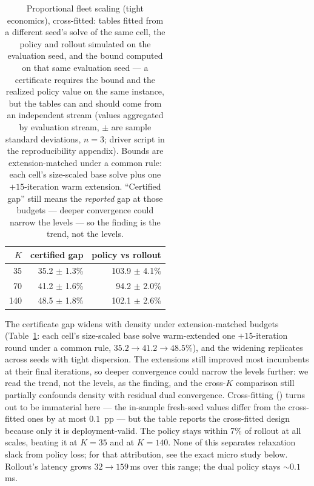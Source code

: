 \documentclass[11pt]{article}
\begin{document}
\begin{table}[t]
\centering
\caption{Proportional fleet scaling (tight economics), cross-fitted:
tables fitted from a different seed's solve of the same cell, the
policy and rollout simulated on the evaluation seed, and the bound
computed on that same evaluation seed --- a certificate requires the
bound and the realized policy value on the same instance, but the
tables can and should come from an independent stream (values
aggregated by evaluation stream, $\pm$ are sample standard
deviations, $n = 3$; driver script in the reproducibility appendix).
Bounds are extension-matched under a common rule: each cell's
size-scaled base solve plus one $+15$-iteration warm extension.
``Certified gap'' still means the \emph{reported} gap at those
budgets --- deeper convergence could narrow the levels --- so the
finding is the trend, not the levels.}
\label{tab:scaling}
\small
\begin{tabular}{rrr}
\toprule
$K$ & certified gap & policy vs rollout \\
\midrule
35 & 35.2 $\pm$ 1.3\% & 103.9 $\pm$ 4.1\% \\
70 & 41.2 $\pm$ 1.6\% & 94.2 $\pm$ 2.0\% \\
140 & 48.5 $\pm$ 1.8\% & 102.1 $\pm$ 2.6\% \\
\bottomrule
\end{tabular}
\end{table}

The certificate gap widens with density under extension-matched
budgets (Table~\ref{tab:scaling}: each cell's size-scaled base solve
warm-extended one $+15$-iteration round under a common rule,
$35.2 \to 41.2 \to 48.5\%$), and the widening replicates across
seeds with tight dispersion. The extensions still improved most
incumbents at their final iterations, so deeper convergence could
narrow the levels further: we read the trend, not the levels, as the
finding, and the cross-$K$ comparison still partially confounds
density with residual dual convergence. Cross-fitting
() turns out to
be immaterial here --- the in-sample fresh-seed values differ from
the cross-fitted ones by at most $0.1$~pp --- but the table reports
the cross-fitted design because only it is deployment-valid. The
policy stays within 7\% of
rollout at all scales, beating it at $K = 35$ and at
$K = 140$. None of this separates
relaxation slack from policy loss; for that attribution, see the exact
micro study below. Rollout's latency
grows $32 \to 159$\,ms over this
range; the dual policy stays ${\sim}0.1$\,ms.
\end{document}
